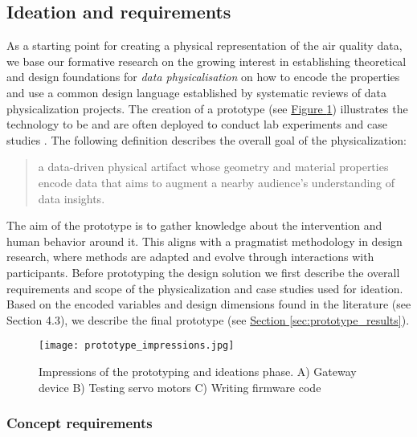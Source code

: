 \subsection{Ideation and requirements}
\label{sec:ideation}

As a starting point for creating a physical representation of the air quality data, we base our formative research on the growing interest in establishing theoretical and design foundations for \textit{data physicalisation} \cite{hornecker_design_2023, sauve_physecology_2022, bae_making_2022} on how to encode the properties and use a common design language \cite{ranasinghe_encoding_2023, sosa_data_2018} established by systematic reviews of data physicalization projects. The creation of a prototype (see \hyperref[fig:prototype-impressions]{Figure \ref*{fig:prototype-impressions}}) illustrates the technology to be and are often deployed to conduct lab experiments and case studies \cite{jonathan_lazar_research_2017}. The following definition describes the overall goal of the physicalization:

\begin{quote}
a data-driven physical artifact whose geometry and material properties encode data that aims to augment a nearby audience’s understanding of data insights.
\end{quote}

The aim of the prototype is to gather knowledge about the intervention and human behavior around it. This aligns with a pragmatist methodology in design research, where methods are adapted and evolve through interactions with participants. Before prototyping the design solution we first describe the overall requirements and scope of the physicalization and case studies used for ideation. Based on the encoded variables and design dimensions found in the literature (see Section 4.3), we describe the final prototype (see \hyperref[sec:prototype_results]{Section \ref*{sec:prototype_results}}).

\begin{figure}[b]
    \centering
    \texttt{[image: prototype\_impressions.jpg]}
    \caption{Impressions of the prototyping and ideations phase. A) Gateway device B) Testing servo motors C) Writing firmware code}
    \label{fig:prototype-impressions}
\end{figure}

\subsubsection{Concept requirements}


